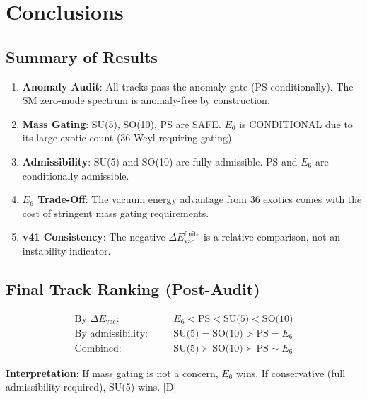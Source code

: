 \documentclass[11pt,a4paper]{article}
\newcommand{\tagD}{\textcolor{blue!70!black}{[D]}}
\begin{document}
\section{Conclusions}
\label{sec:conclusions}

\subsection{Summary of Results}

\begin{enumerate}
    \item \textbf{Anomaly Audit}: All tracks pass the anomaly gate (PS conditionally).
          The SM zero-mode spectrum is anomaly-free by construction.

    \item \textbf{Mass Gating}: SU(5), SO(10), PS are SAFE. $E_6$ is CONDITIONAL
          due to its large exotic count (36 Weyl requiring gating).

    \item \textbf{Admissibility}: SU(5) and SO(10) are fully admissible.
          PS and $E_6$ are conditionally admissible.

    \item \textbf{$E_6$ Trade-Off}: The vacuum energy advantage from 36 exotics
          comes with the cost of stringent mass gating requirements.

    \item \textbf{v41 Consistency}: The negative $\Delta E_{\text{vac}}^{\text{finite}}$
          is a relative comparison, not an instability indicator.
\end{enumerate}

\subsection{Final Track Ranking (Post-Audit)}

\begin{resultbox}
\begin{equation}
\label{eq:final-ranking}
\boxed{
\begin{array}{rcl}
\text{By } \Delta E_{\text{vac}}: & \quad & E_6 < \text{PS} < \text{SU(5)} < \text{SO(10)} \\[0.5em]
\text{By admissibility}: & \quad & \text{SU(5)} = \text{SO(10)} > \text{PS} = E_6 \\[0.5em]
\text{Combined}: & \quad & \text{SU(5)} \succ \text{SO(10)} \succ \text{PS} \sim E_6
\end{array}
}
\end{equation}

\textbf{Interpretation}: If mass gating is not a concern, $E_6$ wins.
If conservative (full admissibility required), SU(5) wins.
\tagD
\end{resultbox}
\end{document}
